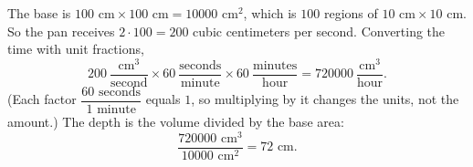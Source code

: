 The base is $100\text{ cm}\times100\text{ cm}=10000\text{ cm}^2$, which is $100$ regions of $10\text{ cm}\times10\text{ cm}$. So the pan receives $2\cdot100=200$ cubic centimeters per second. Converting the time with unit fractions,
\[
200\ \dfrac{\text{cm}^3}{\text{second}}\times60\ \dfrac{\text{seconds}}{\text{minute}}\times60\ \dfrac{\text{minutes}}{\text{hour}}=720000\ \dfrac{\text{cm}^3}{\text{hour}} .
\]
(Each factor $\dfrac{60\text{ seconds}}{1\text{ minute}}$ equals $1$, so multiplying by it changes the units, not the amount.) The depth is the volume divided by the base area:
\[
\dfrac{720000\text{ cm}^3}{10000\text{ cm}^2}=\boxed{72}\text{ cm}.
\]

